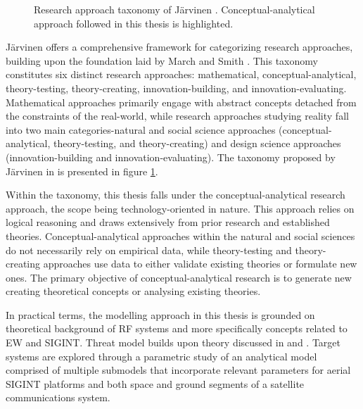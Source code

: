 \documentclass[english, 12pt, a4paper, elec, utf8, a-1b, online]{aaltothesis}
\begin{document}
\begin{figure}[h]
  \centering
  
  \caption{Research approach taxonomy of Järvinen \cite{jarvinen2011tutkimustyon, jarvinen2004research}. Conceptual-analytical approach followed in this thesis is highlighted.}
  \label{fig-research-taxonomy}
\end{figure}

Järvinen \cite{jarvinen2011tutkimustyon, jarvinen2004research} offers a comprehensive framework for categorizing research approaches, building upon the foundation laid by March and Smith \cite{march1995design}.
This taxonomy constitutes six distinct research approaches: mathematical, conceptual-analytical, theory-testing, theory-creating, innovation-building, and innovation-evaluating.
Mathematical approaches primarily engage with abstract concepts detached from the constraints of the real-world, while research approaches studying reality fall into two main categories-natural and social science approaches (conceptual-analytical, theory-testing, and theory-creating) and design science approaches (innovation-building and innovation-evaluating).
The taxonomy proposed by Järvinen in \cite{jarvinen2011tutkimustyon, jarvinen2004research} is presented in figure \ref{fig-research-taxonomy}.

Within the taxonomy, this thesis falls under the conceptual-analytical research approach, the scope being technology-oriented in nature. This approach relies on logical reasoning and draws extensively from prior research and established theories. Conceptual-analytical approaches within the natural and social sciences do not necessarily rely on empirical data, while theory-testing and theory-creating approaches use data to either validate existing theories or formulate new ones. The primary objective of conceptual-analytical research is to generate new creating theoretical concepts or analysing existing theories.

In practical terms, the modelling approach in this thesis is grounded on theoretical background of RF systems and more specifically concepts related to EW and SIGINT.
Threat model builds upon theory discussed in \cite{kosola2013digitaalinen} and \cite{wiley2006elint}.
Target systems are explored through a parametric study of an analytical model comprised of multiple submodels that incorporate relevant parameters for aerial SIGINT platforms and both space and ground segments of a satellite communications system.
\end{document}
